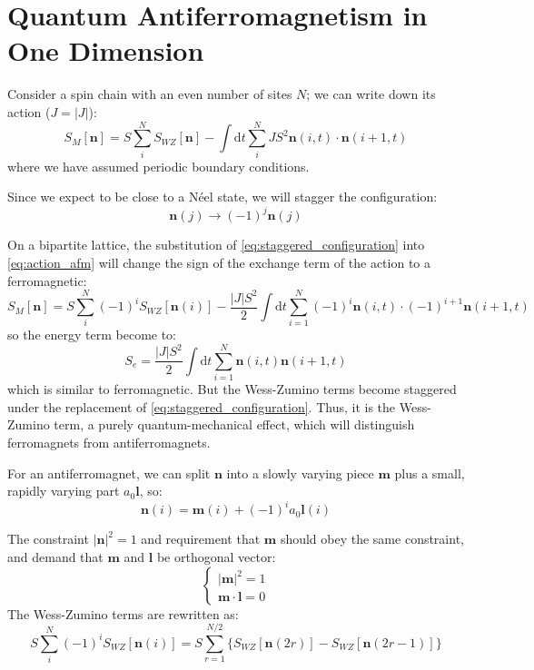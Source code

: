 \section{Quantum Antiferromagnetism in One Dimension}

Consider a spin chain with an even number of sites $N$; we can write down its action ($J=|J|$):
\begin{equation}
    \label{eq:action_afm}
    S_M[\bm{n}] = S \sum_{i}^N S_{WZ}[\bm{n}] - \int \mathrm{d}t \sum_{i}^N J S^2 \bm{n}(i,t) \cdot \bm{n}(i+1, t)
\end{equation}
where we have assumed periodic boundary conditions.



Since we expect to be close to a N\'{e}el state, we will stagger the configuration:
\begin{equation}
    \label{eq:staggered_configuration}
    \bm{n}(j) \to (-1)^j \bm{n}(j)
\end{equation}

On a bipartite lattice, the substitution of \cref{eq:staggered_configuration} into \cref{eq:action_afm} will change the sign of the exchange term of the action to a ferromagnetic:
\begin{equation}
S_M[\bm{n}] = S \sum_{i}^N (-1)^i S_{WZ}[\bm{n}(i)] - \frac{|J|S^2}{2} \int \mathrm{d}t \sum_{i=1}^N (-1)^i \bm{n}(i,t) \cdot (-1)^{i+1} \bm{n}(i+1,t)
\end{equation}
so the energy term become to:
\begin{equation}
S_e = \frac{|J|S^2}{2} \int \mathrm{d}t \sum_{i=1}^N \bm{n}(i,t) \bm{n}(i+1,t)
\end{equation}
which is similar to ferromagnetic.
But the Wess-Zumino terms become staggered under the replacement of \cref{eq:staggered_configuration}.
Thus, it is the Wess-Zumino term, a purely quantum-mechanical effect, 
which will distinguish ferromagnets from antiferromagnets.

For an antiferromagnet, we can split $\bm{n}$ into a slowly varying piece $\bm{m}$ plus a small, rapidly varying part $a_0 \bm{l}$, so:
\begin{equation}
\bm{n}(i) = \bm{m}(i) + (-1)^i a_0 \bm{l}(i)
\end{equation}

The constraint $|\bm{n}|^2=1$ and requirement that $\bm{m}$ should obey the same constraint, and demand that $\bm{m}$ and $\bm{l}$ be orthogonal vector:
\begin{equation}
\begin{cases}
|\bm{m}|^2 = 1 \\
\bm{m} \cdot \bm{l} = 0
\end{cases}
\end{equation}
The Wess-Zumino terms are rewritten as:
\begin{equation}
S \sum_i^N (-1)^i S_{WZ}[\bm{n}(i)] = S \sum_{r=1}^{N/2} \{ S_{WZ}[\bm{n}(2r)] - S_{WZ}[\bm{n}(2r-1)] \}
\end{equation}

